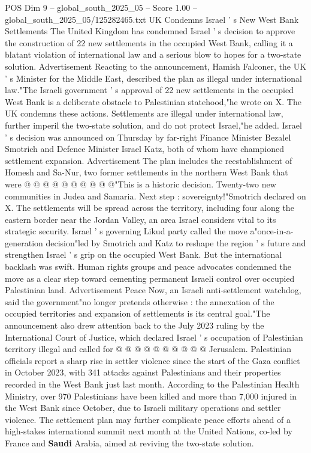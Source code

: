 \begin{textsample}{POS Dim 9 – global\_south\_2025\_05 – Score 1.00 – global\_south\_2025\_05/125282465.txt}  \label{ex:f9_pos_223}
UK Condemns Israel ' s New West Bank Settlements The United Kingdom has condemned Israel ' s decision to approve the construction of 22 new settlements in the occupied West Bank, calling it a blatant violation of international law and a serious blow to hopes for a two-state solution.
Advertisement Reacting to the announcement, Hamish Falconer, the UK ' s Minister for the Middle East, described the plan as illegal under international law."The Israeli government ' s approval of 22 new settlements in the occupied West Bank is a deliberate obstacle to Palestinian statehood,"he wrote on X.
The UK condemns these actions.
Settlements are illegal under international law, further imperil the two-state solution, and do not protect Israel,"he added.
Israel ' s decision was announced on Thursday by far-right Finance Minister Bezalel Smotrich and Defence Minister Israel Katz, both of whom have championed settlement expansion.
Advertisement The plan includes the reestablishment of Homesh and Sa-Nur, two former settlements in the northern West Bank that were @ @ @ @ @ @ @ @ @ @"This is a historic decision.
Twenty-two new communities in Judea and Samaria.
Next step : sovereignty!"Smotrich declared on X.
The settlements will be spread across the territory, including four along the eastern border near the Jordan Valley, an area Israel considers vital to its strategic security.
Israel ' s governing Likud party called the move a"once-in-a-generation decision"led by Smotrich and Katz to reshape the region ' s future and strengthen Israel ' s grip on the occupied West Bank.
But the international backlash was swift.
Human rights groups and peace advocates condemned the move as a clear step toward cementing permanent Israeli control over occupied Palestinian land.
Advertisement Peace Now, an Israeli anti-settlement watchdog, said the government"no longer pretends otherwise : the annexation of the occupied territories and expansion of settlements is its central goal."The announcement also drew attention back to the July 2023 ruling by the International Court of Justice, which declared Israel ' s occupation of Palestinian territory illegal and called for @ @ @ @ @ @ @ @ @ @ Jerusalem.
Palestinian officials report a sharp rise in settler violence since the start of the Gaza conflict in October 2023, with 341 attacks against Palestinians and their properties recorded in the West Bank just last month.
According to the Palestinian Health Ministry, over 970 Palestinians have been killed and more than 7,000 injured in the West Bank since October, due to Israeli military operations and settler violence.
The settlement plan may further complicate peace efforts ahead of a high-stakes international summit next month at the United Nations, co-led by France and \textbf{Saudi} Arabia, aimed at reviving the two-state solution.

\end{textsample}
